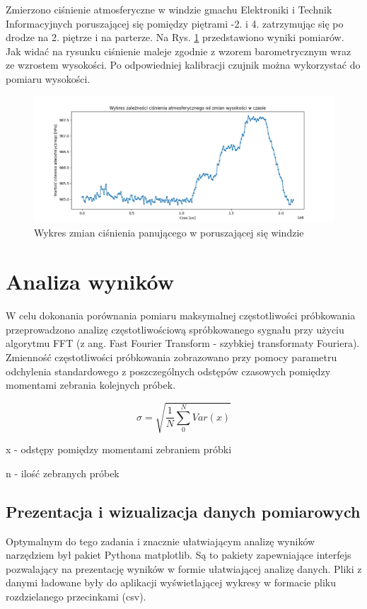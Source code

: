 Zmierzono ciśnienie atmosferyczne w windzie gmachu Elektroniki i Technik Informacyjnych poruszającej się pomiędzy piętrami -2. i 4. zatrzymując się po drodze na 2. piętrze i na parterze. Na Rys. \ref{fig:winda} przedstawiono wyniki pomiarów. Jak widać na rysunku ciśnienie maleje zgodnie z wzorem barometrycznym wraz ze wzrostem wysokości. Po odpowiedniej kalibracji czujnik można wykorzystać do pomiaru wysokości.


\begin{figure}[H]
	\centering
		\includegraphics[width=14cm]{winda}
	\caption{Wykres zmian ciśnienia panującego w poruszającej się windzie} 
	\label{fig:winda}
\end{figure}


\section{Analiza wyników}
W celu dokonania porównania pomiaru maksymalnej częstotliwości próbkowania przeprowadzono analizę częstotliwościową spróbkowanego sygnału przy użyciu algorytmu FFT (z ang. Fast Fourier Transform - szybkiej transformaty Fouriera).
Zmienność częstotliwości próbkowania zobrazowano przy pomocy parametru odchylenia standardowego z poszczególnych odstępów czasowych pomiędzy momentami zebrania kolejnych próbek.

\begin{equation}
\sigma=\sqrt{\dfrac{1}{N}\sum_{0}^{N}{Var(x)}}
\end{equation}

x - odstępy pomiędzy momentami zebraniem próbki

n - ilość zebranych próbek


\subsection{Prezentacja i wizualizacja danych pomiarowych}
Optymalnym do tego zadania i znacznie ułatwiającym analizę wyników narzędziem był pakiet Pythona matplotlib. Są to pakiety zapewniające interfejs pozwalający na prezentację wyników w formie ułatwiającej analizę danych. Pliki z danymi ładowane były do aplikacji wyświetlającej wykresy w formacie pliku rozdzielanego przecinkami (csv).  




